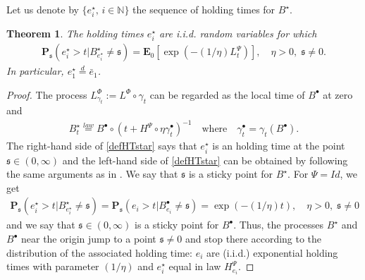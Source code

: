 \documentclass[11pt,a4paper]{article}
\theoremstyle{plain}
\newtheorem{theorem}{Theorem}[section]
\theoremstyle{definition}
\theoremstyle{remark}
\begin{document}
		
		Let us denote by $\{e^\star_i,\, i \in \mathbb{N}\}$ the sequence of holding times for $B^\star$. 
		
		
		\begin{theorem}
			The holding times $e^\star_i$ are i.i.d. random variables for which
			\begin{align}
				\label{defHTstar}
				\mathbf{P}_{\mathfrak{s}}(e^\star_i > t | B^\star_{e^\star_i} \neq \mathfrak{s}) = \mathbf{E}_0\left[\exp\left(-(1/\eta) L^\Psi_t \right)\right], \quad \eta>0, \; \mathfrak{s} \neq 0.
			\end{align}
			In particular, $e^\star_1 \stackrel{d}{=} \bar{e}_1$.
			\label{thm:HTstar}
		\end{theorem}
		\begin{proof}
			The process $L^\Phi_{\gamma_t}:= L^\Phi \circ \gamma_t$ can be regarded as the local time of $B^\bullet$ at zero \cite[section 14]{ito1963brownian} and
			\begin{align*}
				B^\star_t \stackrel{law}{=} B^\bullet \circ (t + H^\Psi \circ \eta \gamma^\bullet_t )^{-1}  \quad \textrm{where} \quad \gamma^\bullet_t = \gamma_t(B^\bullet).
			\end{align*}
			The right-hand side of \eqref{defHTstar} says that $e^\star_i$ is an holding time at the point $\mathfrak{s} \in (0, \infty)$ and the left-hand side of \eqref{defHTstar} can be obtained by following the same arguments as in \cite[Lemma 6]{d2022fractionalsticky}. We say that $\mathfrak{s}$ is a sticky point for $B^\star$. For $\Psi=Id$, we get
			\begin{align*}
				\mathbf{P}_\mathfrak{s}(e^\star_i > t | B^\star_{e^\star_i} \neq \mathfrak{s}) = \mathbf{P}_\mathfrak{s}(e_i > t | B^\bullet_{e_i} \neq \mathfrak{s}) = \exp\left(-(1/\eta) t \right), \quad \eta>0, \; \mathfrak{s}\neq 0
			\end{align*}
			and we say that $\mathfrak{s} \in (0, \infty)$ is a sticky point for $B^\bullet$. Thus, the processes $B^\star$ and $B^\bullet$ near the origin jump to a point $\mathfrak{s}\neq 0$ and stop there according to the distribution of the associated holding time: $e_i$ are (i.i.d.) exponential holding times with parameter $(1/\eta)$ and $e^\star_i$ equal in law $H^\Psi_{e_i}$.
		\end{proof}
		
\end{document}
